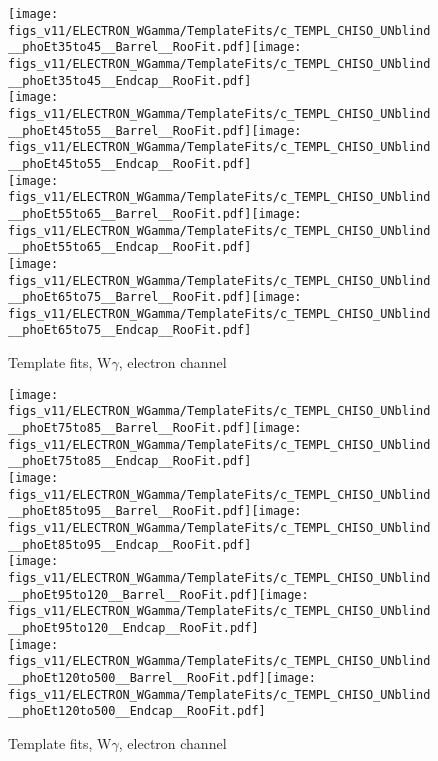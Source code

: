 \begin{figure}[htb]
  \begin{center}
   \texttt{[image: figs\_v11/ELECTRON\_WGamma/TemplateFits/c\_TEMPL\_CHISO\_UNblind\_\_phoEt35to45\_\_Barrel\_\_RooFit.pdf]}\texttt{[image: figs\_v11/ELECTRON\_WGamma/TemplateFits/c\_TEMPL\_CHISO\_UNblind\_\_phoEt35to45\_\_Endcap\_\_RooFit.pdf]}\\
   \texttt{[image: figs\_v11/ELECTRON\_WGamma/TemplateFits/c\_TEMPL\_CHISO\_UNblind\_\_phoEt45to55\_\_Barrel\_\_RooFit.pdf]}\texttt{[image: figs\_v11/ELECTRON\_WGamma/TemplateFits/c\_TEMPL\_CHISO\_UNblind\_\_phoEt45to55\_\_Endcap\_\_RooFit.pdf]}\\
   \texttt{[image: figs\_v11/ELECTRON\_WGamma/TemplateFits/c\_TEMPL\_CHISO\_UNblind\_\_phoEt55to65\_\_Barrel\_\_RooFit.pdf]}\texttt{[image: figs\_v11/ELECTRON\_WGamma/TemplateFits/c\_TEMPL\_CHISO\_UNblind\_\_phoEt55to65\_\_Endcap\_\_RooFit.pdf]}\\
   \texttt{[image: figs\_v11/ELECTRON\_WGamma/TemplateFits/c\_TEMPL\_CHISO\_UNblind\_\_phoEt65to75\_\_Barrel\_\_RooFit.pdf]}\texttt{[image: figs\_v11/ELECTRON\_WGamma/TemplateFits/c\_TEMPL\_CHISO\_UNblind\_\_phoEt65to75\_\_Endcap\_\_RooFit.pdf]}\\
  \label{fig:templateFits_CHISO_ELECTRON_2}
  \caption{Template fits, W$\gamma$, electron channel}
  \end{center}
\end{figure}

\begin{figure}[htb]
  \begin{center}
   \texttt{[image: figs\_v11/ELECTRON\_WGamma/TemplateFits/c\_TEMPL\_CHISO\_UNblind\_\_phoEt75to85\_\_Barrel\_\_RooFit.pdf]}\texttt{[image: figs\_v11/ELECTRON\_WGamma/TemplateFits/c\_TEMPL\_CHISO\_UNblind\_\_phoEt75to85\_\_Endcap\_\_RooFit.pdf]}\\
   \texttt{[image: figs\_v11/ELECTRON\_WGamma/TemplateFits/c\_TEMPL\_CHISO\_UNblind\_\_phoEt85to95\_\_Barrel\_\_RooFit.pdf]}\texttt{[image: figs\_v11/ELECTRON\_WGamma/TemplateFits/c\_TEMPL\_CHISO\_UNblind\_\_phoEt85to95\_\_Endcap\_\_RooFit.pdf]}\\
   \texttt{[image: figs\_v11/ELECTRON\_WGamma/TemplateFits/c\_TEMPL\_CHISO\_UNblind\_\_phoEt95to120\_\_Barrel\_\_RooFit.pdf]}\texttt{[image: figs\_v11/ELECTRON\_WGamma/TemplateFits/c\_TEMPL\_CHISO\_UNblind\_\_phoEt95to120\_\_Endcap\_\_RooFit.pdf]}\\
   \texttt{[image: figs\_v11/ELECTRON\_WGamma/TemplateFits/c\_TEMPL\_CHISO\_UNblind\_\_phoEt120to500\_\_Barrel\_\_RooFit.pdf]}\texttt{[image: figs\_v11/ELECTRON\_WGamma/TemplateFits/c\_TEMPL\_CHISO\_UNblind\_\_phoEt120to500\_\_Endcap\_\_RooFit.pdf]}\\
  \label{fig:templateFits_CHISO_ELECTRON_3}
  \caption{Template fits, W$\gamma$, electron channel}
  \end{center}
\end{figure}

